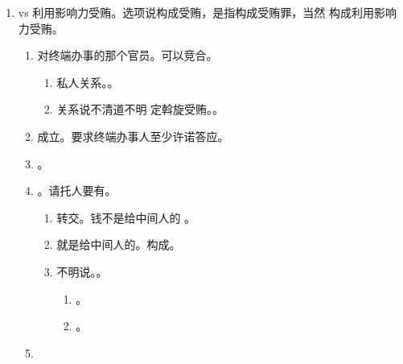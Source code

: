 \begin{enumerate}
\begin{enumerate}
          \item 罪数问题。
          \item {}。。
                
          \item {}。。
          \item {}。介绍人主动牵线搭桥，后面的事儿你俩自个聊。。
        \end{enumerate}
  \item vs 利用影响力受贿。选项说构成受贿，是指构成受贿罪，当然 \bdy 构成利用影响力受贿。
        \begin{enumerate}
          \item 对终端办事的那个官员。可以竞合。
                \begin{enumerate}
                  \item 私人关系。。
                  \item 关系说不清道不明 \yjt 定斡旋受贿。。
                \end{enumerate}
          \item 成立。要求终端办事人至少许诺答应。
          \item {}。
          \item {}。请托人要有。
                \begin{enumerate}
                  \item 转交。钱不是给中间人的 \yjt {}。
                  \item 就是给中间人的。构成。
                  \item 不明说。。
                        \begin{enumerate}
                          \item {}。
                          \item {}。
                        \end{enumerate}
                \end{enumerate}
          \item {}
\end{enumerate}
\end{enumerate}
